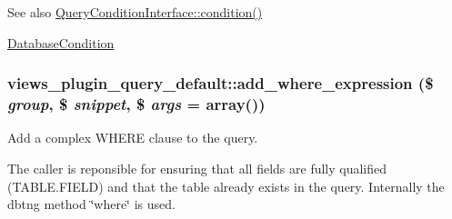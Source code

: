 \begin{DoxySeeAlso}{See also}
\hyperlink{interfaceQueryConditionInterface_aa6d9d96fa17441b5222d1ffddd4c1799}{QueryConditionInterface::condition()} 

\hyperlink{classDatabaseCondition}{DatabaseCondition} 
\end{DoxySeeAlso}
\hypertarget{classviews__plugin__query__default_ae44670637e83514a8fc472190397e51d}{
\subsubsection[{add\_\-where\_\-expression}]{\setlength{\rightskip}{0pt plus 5cm}views\_\-plugin\_\-query\_\-default::add\_\-where\_\-expression (\$ {\em group}, \/  \$ {\em snippet}, \/  \$ {\em args} = {\ttfamily array()})}}
\label{classviews__plugin__query__default_ae44670637e83514a8fc472190397e51d}
Add a complex WHERE clause to the query.

The caller is reponsible for ensuring that all fields are fully qualified (TABLE.FIELD) and that the table already exists in the query. Internally the dbtng method \char`\"{}where\char`\"{} is used.


